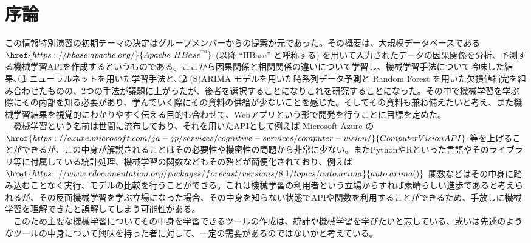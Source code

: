 \documentclass{scrartcl}
\begin{document}
\section{序論}
\label{sec:org5388bcc}
この情報特別演習の初期テーマの決定はグループメンバーからの提案が元であった。その概要は、大規模データベースである \(\href{https://hbase.apache.org/}{Apache \  HBase \textsuperscript{\texttrademark}}\) (以降 ``HBase'' と呼称する) を用いて入力されたデータの因果関係を分析、予測する機械学習APIを作成するというものである。ここから因果関係と相関関係の違いについて学習し、機械学習手法について吟味した結果、\textcircled{\scriptsize 1} ニューラルネットを用いた学習手法と、\textcircled{\scriptsize 2} (S)ARIMA モデルを用いた時系列データ予測と Random Forest を用いた欠損値補完を組み合わせたものの、2つの手法が議題に上がったが、後者を選択することになりこれを研究することになった。その中で機械学習を学ぶ際にその内部を知る必要があり、学んでいく際にその資料の供給が少ないことを感じた。そしてその資料も兼ね備えたいと考え、また機械学習結果を視覚的にわかりやすく伝える目的も合わせて、Webアプリという形で開発を行うことに目標を定めた。\\
\newline
　機械学習という名前は世間に流布しており、それを用いたAPIとして例えば Microsoft Azure の \(\href{https://azure.microsoft.com/ja-jp/services/cognitive-services/computer-vision/}{Computer Vision API}\) 等を上げることができるが、この中身が解説されることはその必要性や機密性の問題から非常に少ない。またPythonやRといった言語やそのライブラリ等に付属している統計処理、機械学習の関数などもその殆どが簡便化されており、例えば \(\href{https://www.rdocumentation.org/packages/forecast/versions/8.1/topics/auto.arima}{auto.arima()}\) 関数などはその中身に踏み込むことなく実行、モデルの比較を行うことができる。これは機械学習の利用者という立場からすれば素晴らしい進歩であると考えられるが、その反面機械学習を学ぶ立場になった場合、その中身を知らない状態でAPIや関数を利用することができるため、手放しに機械学習を理解できたと誤解してしまう可能性がある。\\
　このため主要な機械学習についてその中身を学習できるツールの作成は、統計や機械学習を学びたいと志している、或いは先述のようなツールの中身について興味を持った者に対して、一定の需要があるのではないかと考えている。\\
\end{document}

